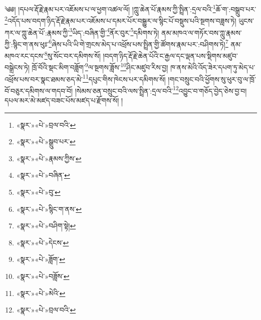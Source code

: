 ༄༅། །དཔལ་རྡོ་རྗེ་རྣམ་པར་འཇོམས་པ་ལ་ཕྱག་འཚལ་ལོ། །ཀླུ་ཆེན་པོ་རྣམས་ཀྱི་སྤྲིན་:དྲལ་བའི་\footnote{«སྣར་»«པེ་»བྲལ་བའི་}ཆོ་ག་:བསྒྲུབ་པར་\footnote{«སྣར་»«པེ་»སྒྲུབ་པར་}འདོད་པས་བདག་ཉིད་རྡོ་རྗེ་རྣམ་པར་འཇོམས་པ་དམར་པོར་བསྒྱུར་ལ་སྙིང་པོ་བསྡུས་པའི་སྔགས་བཟླས་ཏེ། ཡུངས་ཀར་ལ་ཀླུ་ཆེན་པོ་:རྣམས་ཀྱི་\footnote{«སྣར་»«པེ་»རྣམས་ཀྱིས་}ཡིད་:བཞིན་གྱི་\footnote{«སྣར་»«པེ་»བཞིན་}ནོར་བུར་\footnote{«སྣར་»«པེ་»བུ་}དམིགས་ཏེ། ནམ་མཁའ་ལ་གཏོར་བས་ཀླུ་རྣམས་ཀྱི་:སྙིང་ག་ནས་ཕུཿ་\footnote{«སྣར་»«པེ་»སྙིང་ག་ནས་}ཞེས་པའི་ཡི་གེ་གྲངས་མེད་པ་འཕྲོས་པས་སྤྲིན་གྱི་ཚོགས་རྣམ་པར་:བཤིགས་ཏེ།\footnote{«སྣར་»«པེ་»བཤིག་སྟེ།} ནམ་མཁའ་རང་དངས་\footnote{«སྣར་»«པེ་»དེངས་}སུ་སོང་བར་དམིགས་སོ། །བདག་ཉིད་རྡོ་རྗེ་ཆེན་པོའི་ང་རྒྱལ་དང་ལྡན་པས་སྡིགས་མཛུབ་བསྒྲེངས་ཏེ། ཁྲོ་བོའི་སྡང་མིག་བཟློག་\footnote{«སྣར་»«པེ་»ཟློག་}ལ་སྔགས་ཟློས་\footnote{«སྣར་»«པེ་»བཟློས་}ཤིང་མཛུབ་རིས་བྱ། ཁ་ནས་མེའི་འོད་ཟེར་དཔག་ཏུ་མེད་པ་འཕྲོས་པས་བར་སྣང་ཐམས་ཅད་མེ་\footnote{«སྣར་»«པེ་»མེའི་}དཔུང་གིས་ཁེངས་པར་དམིགས་སོ། །གང་བསྲུང་བའི་ཕྱོགས་སུ་ཕུར་བུ་ལ་ཁྲོ་བོ་བཅུར་དམིགས་ལ་གདབ་བོ། །སེམས་ཅན་བསྲུང་བའི་ལས་སྤྲིན་:དྲལ་བའི་\footnote{«སྣར་»«པེ་»བྲལ་བའི་}འབྱུང་བ་གཅོད་བྱེད་ཅེས་བྱ་བ། དཔལ་མར་མེ་མཛད་བཟང་པོས་མཛད་པ་རྫོགས་སོ། ། 